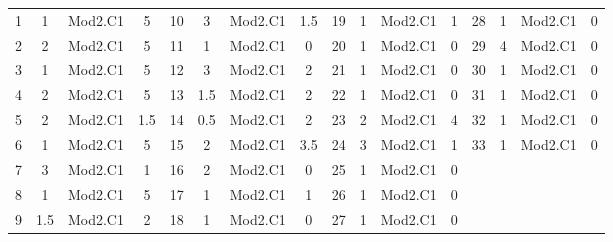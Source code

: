 \footnotesize 
\begin{center} 
\begin{tabular}{|c|c|c|c||c|c|c|c||c|c|c|c||c|c|c|c|} 
1 & 1 & Mod2.C1 & 5 & 10 & 3 & Mod2.C1 & 1.5 & 19 & 1 & Mod2.C1 & 1 & 28 & 1 & Mod2.C1 & 0 \\ 
2 & 2 & Mod2.C1 & 5 & 11 & 1 & Mod2.C1 & 0 & 20 & 1 & Mod2.C1 & 0 & 29 & 4 & Mod2.C1 & 0 \\ 
3 & 1 & Mod2.C1 & 5 & 12 & 3 & Mod2.C1 & 2 & 21 & 1 & Mod2.C1 & 0 & 30 & 1 & Mod2.C1 & 0 \\ 
4 & 2 & Mod2.C1 & 5 & 13 & 1.5 & Mod2.C1 & 2 & 22 & 1 & Mod2.C1 & 0 & 31 & 1 & Mod2.C1 & 0 \\ 
5 & 2 & Mod2.C1 & 1.5 & 14 & 0.5 & Mod2.C1 & 2 & 23 & 2 & Mod2.C1 & 4 & 32 & 1 & Mod2.C1 & 0 \\ 
6 & 1 & Mod2.C1 & 5 & 15 & 2 & Mod2.C1 & 3.5 & 24 & 3 & Mod2.C1 & 1 & 33 & 1 & Mod2.C1 & 0 \\ 
7 & 3 & Mod2.C1 & 1 & 16 & 2 & Mod2.C1 & 0 & 25 & 1 & Mod2.C1 & 0 &  &  &  &  \\ 
8 & 1 & Mod2.C1 & 5 & 17 & 1 & Mod2.C1 & 1 & 26 & 1 & Mod2.C1 & 0 &  &  &  &  \\ 
9 & 1.5 & Mod2.C1 & 2 & 18 & 1 & Mod2.C1 & 0 & 27 & 1 & Mod2.C1 & 0 &  &  &  &  \\ 
\end{tabular} 
\end{center} 
\normalsize 
